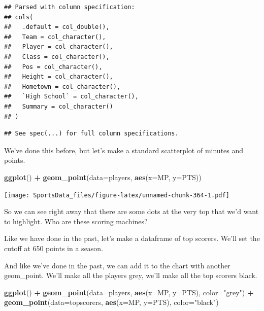 \documentclass[
]{book}
\newenvironment{Shaded}{\begin{snugshade}}{\end{snugshade}}
\newcommand{\DataTypeTok}[1]{\textcolor[rgb]{0.13,0.29,0.53}{#1}}
\newcommand{\DecValTok}[1]{\textcolor[rgb]{0.00,0.00,0.81}{#1}}
\newcommand{\KeywordTok}[1]{\textcolor[rgb]{0.13,0.29,0.53}{\textbf{#1}}}
\newcommand{\NormalTok}[1]{#1}
\newcommand{\OperatorTok}[1]{\textcolor[rgb]{0.81,0.36,0.00}{\textbf{#1}}}
\newcommand{\StringTok}[1]{\textcolor[rgb]{0.31,0.60,0.02}{#1}}
\begin{document}
\begin{verbatim}
## Parsed with column specification:
## cols(
##   .default = col_double(),
##   Team = col_character(),
##   Player = col_character(),
##   Class = col_character(),
##   Pos = col_character(),
##   Height = col_character(),
##   Hometown = col_character(),
##   `High School` = col_character(),
##   Summary = col_character()
## )
\end{verbatim}

\begin{verbatim}
## See spec(...) for full column specifications.
\end{verbatim}

We've done this before, but let's make a standard scatterplot of minutes and points.

\begin{Shaded}
\begin{Highlighting}[]
\KeywordTok{ggplot}\NormalTok{() }\OperatorTok{+}\StringTok{ }\KeywordTok{geom_point}\NormalTok{(}\DataTypeTok{data=}\NormalTok{players, }\KeywordTok{aes}\NormalTok{(}\DataTypeTok{x=}\NormalTok{MP, }\DataTypeTok{y=}\NormalTok{PTS))}
\end{Highlighting}
\end{Shaded}

\texttt{[image: SportsData\_files/figure-latex/unnamed-chunk-364-1.pdf]}

So we can see right away that there are some dots at the very top that we'd want to highlight. Who are these scoring machines?

Like we have done in the past, let's make a dataframe of top scorers. We'll set the cutoff at 650 points in a season.

\begin{Shaded}
\end{Shaded}

And like we've done in the past, we can add it to the chart with another geom\_point. We'll make all the players grey, we'll make all the top scorers black.

\begin{Shaded}
\begin{Highlighting}[]
\KeywordTok{ggplot}\NormalTok{() }\OperatorTok{+}\StringTok{ }\KeywordTok{geom_point}\NormalTok{(}\DataTypeTok{data=}\NormalTok{players, }\KeywordTok{aes}\NormalTok{(}\DataTypeTok{x=}\NormalTok{MP, }\DataTypeTok{y=}\NormalTok{PTS), }\DataTypeTok{color=}\StringTok{"grey"}\NormalTok{) }\OperatorTok{+}\StringTok{ }\KeywordTok{geom_point}\NormalTok{(}\DataTypeTok{data=}\NormalTok{topscorers, }\KeywordTok{aes}\NormalTok{(}\DataTypeTok{x=}\NormalTok{MP, }\DataTypeTok{y=}\NormalTok{PTS), }\DataTypeTok{color=}\StringTok{"black"}\NormalTok{)}
\end{Highlighting}
\end{Shaded}
\end{document}
